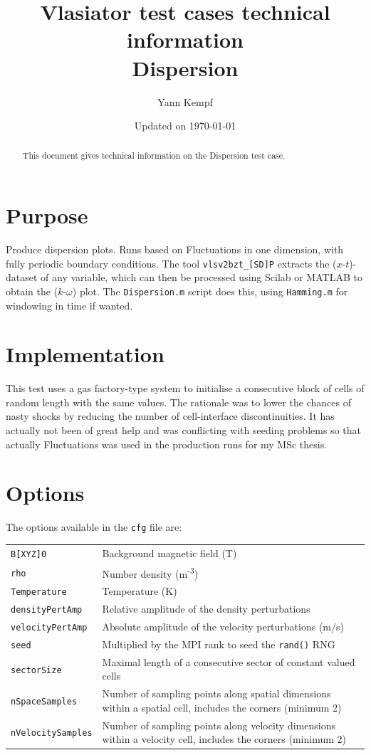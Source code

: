 \documentclass[a4paper,10pt]{scrartcl}
\title{
\Huge{Vlasiator test cases technical information} \\
\LARGE{Dispersion}
}
\author{Yann Kempf}
\date{Updated on \today}
\begin{document}
\maketitle

\begin{abstract}
   This document gives technical information on the Dispersion test case.
\end{abstract}

\section{Purpose}
Produce dispersion plots. Runs based on Fluctuations in one dimension, with fully periodic boundary conditions. The tool \verb=vlsv2bzt_[SD]P= extracts the ($x$-$t$)-dataset of any variable, which can then be processed using Scilab or MATLAB to obtain the ($k$-$\omega$) plot. The \verb=Dispersion.m= script does this, using \verb=Hamming.m= for windowing in time if wanted.


\section{Implementation}
This test uses a gas factory-type system to initialise a consecutive block of cells of random length with the same values. The rationale was to lower the chances of nasty shocks by reducing the number of cell-interface discontinuities. It has actually not been of great help and was conflicting with seeding problems so that actually Fluctuations was used in the production runs for my MSc thesis.

\section{Options}
The options available in the \verb=cfg= file are:

\begin{tabularx}{\textwidth}{lX}
   \verb=B[XYZ]0= & Background magnetic field (T) \\
   \verb=rho= & Number density (m\textsuperscript{-3}) \\
   \verb=Temperature= & Temperature (K) \\
   \verb=densityPertAmp= & Relative amplitude of the density perturbations \\
   \verb=velocityPertAmp= & Absolute amplitude of the velocity perturbations (m/s) \\
   \verb=seed= & Multiplied by the MPI rank to seed the \verb=rand()= RNG \\
   \verb=sectorSize= & Maximal length of a consecutive sector of constant valued cells \\
   \verb=nSpaceSamples= & Number of sampling points along spatial dimensions within a spatial cell, includes the corners (minimum 2) \\
   \verb=nVelocitySamples= & Number of sampling points along velocity dimensions within a velocity cell, includes the corners (minimum 2)
\end{tabularx}
\end{document}
